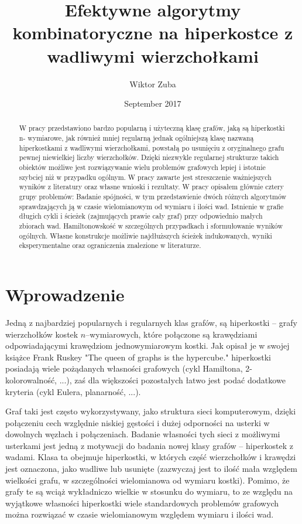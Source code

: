 \documentclass{pracamgr}
\author{Wiktor Zuba}
\title{Efektywne algorytmy kombinatoryczne na hiperkostce z wadliwymi wierzchołkami}
\date{September 2017}
\begin{document}
\maketitle

\begin{abstract}
W pracy przedstawiono bardzo popularną i użyteczną klasę grafów, jaką są hiperkostki n- wymiarowe,
jak również mniej regularną jednak ogólniejszą klasę nazwaną hiperkostkami z wadliwymi wierzchołkami,
powstałą po usunięciu z oryginalnego grafu pewnej niewielkiej liczby wierzchołków. Dzięki niezwykle
regularnej strukturze takich obiektów możliwe jest rozwiązywanie wielu problemów grafowych lepiej i istotnie
szybciej niż w przypadku ogólnym. W pracy zawarte jest streszczenie ważniejszych wyników z literatury oraz własne wnioski i rezultaty.
W  pracy opisałem głównie cztery grupy problemów: Badanie spójności,
w tym przedstawienie dwóch różnych algorytmów sprawdzających ją w czasie wielomianowym od wymiaru i ilości wad.
Istnienie w grafie długich cykli i ścieżek (zajmujących prawie cały graf) przy odpowiednio małych zbiorach wad.
Hamiltonowskość w szczególnych przypadkach i sformułowanie wyników ogólnych.
Własne konstrukcje możliwie najdłuższych ścieżek indukowanych, wyniki eksperymentalne oraz  ograniczenia znalezione w literaturze.
\end{abstract}

\tableofcontents

 \chapter*{Wprowadzenie}
  Jedną z najbardziej popularnych i regularnych klas grafów, są hiperkostki -- grafy wierzchołków kostek $n$--wymiarowych,
  które połączone są krawędziami odpowiadającymi krawędziom jednowymiarowym kostki.
  Jak opisał je w swojej książce \cite{Ruskey} Frank Ruskey "The queen of graphs is the hypercube." hiperkostki posiadają
  wiele pożądanych własności grafowych (cykl Hamiltona, 2-kolorowalność, ...),
  zaś dla większości pozostałych łatwo jest podać dodatkowe kryteria (cykl Eulera, planarność, ...).
  
  Graf taki jest często wykorzystywany, jako struktura sieci komputerowym, dzięki połączeniu cech względnie niskiej gęstości i dużej odporności na usterki
  w dowolnych węzłach i połączeniach.
  Badanie własności tych sieci z możliwymi usterkami jest jedną z motywacji do badania nowej klasy grafów -- hiperkostek z wadami.
  Klasa ta obejmuje hiperkostki, w których część wierzchołków i krawędzi jest oznaczona, jako wadliwe lub usunięte
  (zazwyczaj jest to ilość mała względem wielkości grafu, w szczególności wielomianowa od wymiaru kostki).  
  Pomimo, że grafy te są wciąż wykładniczo wielkie w stosunku do wymiaru, to ze względu na wyjątkowe własności hiperkostki wiele standardowych
  problemów grafowych można rozwiązać w czasie wielomianowym względem wymiaru i ilości wad.
  
\end{document}
